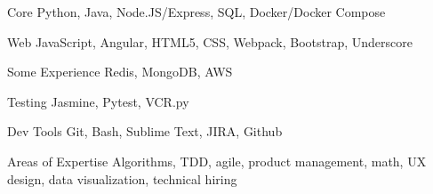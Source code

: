 

\begin{cvskills}

  \cvskill
    {Core}
    {Python, Java, Node.JS/Express, SQL, Docker/Docker Compose}

  \cvskill
    {Web}
    {JavaScript, Angular, HTML5, CSS, Webpack, Bootstrap, Underscore}

  \cvskill
    {Some Experience}
    {Redis, MongoDB, AWS}

  \cvskill
    {Testing}
    {Jasmine, Pytest, VCR.py}

  \cvskill
    {Dev Tools}
    {Git, Bash, Sublime Text, JIRA, Github}

  \cvskill
    {Areas of Expertise}
    {Algorithms, TDD, agile, product management, math, UX design, data visualization, technical hiring}

\end{cvskills}
